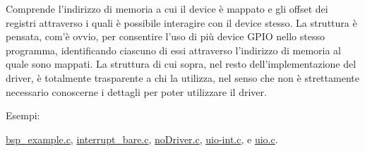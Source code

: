 Comprende l'indirizzo di memoria a cui il device è mappato e gli offset dei registri attraverso i quali è possibile interagire con il device stesso. La struttura è pensata, com'è ovvio, per consentire l'uso di più device G\+P\+I\+O nello stesso programma, identificando ciascuno di essi attraverso l'indirizzo di memoria al quale sono mappati. La struttura di cui sopra, nel resto dell'implementazione del driver, è totalmente trasparente a chi la utilizza, nel senso che non è strettamente necessario conoscerne i dettagli per poter utilizzare il driver. \begin{Desc}
\item[Esempi\+: ]\par
\hyperlink{bsp_example_8c-example}{bsp\+\_\+example.\+c}, \hyperlink{interrupt_bare_8c-example}{interrupt\+\_\+bare.\+c}, \hyperlink{no_driver_8c-example}{no\+Driver.\+c}, \hyperlink{uio-int_8c-example}{uio-\/int.\+c}, e \hyperlink{uio_8c-example}{uio.\+c}.\end{Desc}


